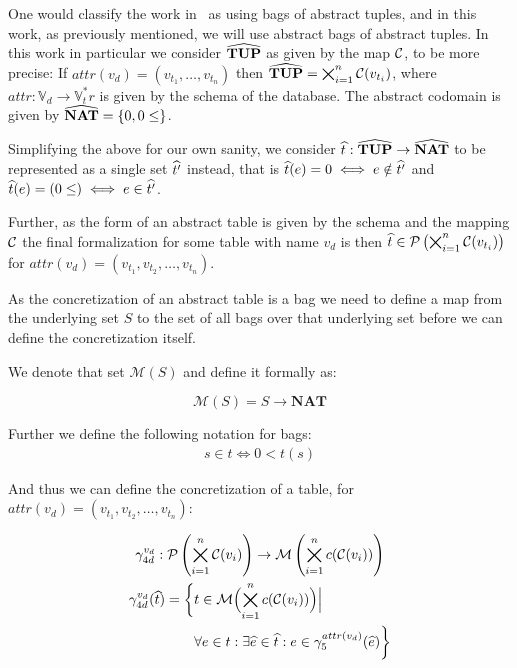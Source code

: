 One would classify the work in~\cite{halder_abstract_2012} as using bags of abstract tuples, and in this work, as previously mentioned, we will use abstract bags of abstract tuples.
In this work in particular we consider $\widehat{\mathbf{TUP}}$ as given by the map $\mathcal{C}$, to be more precise:
If $attr(v_d) = (v_{t_1}, \dots, v_{t_n})$ then $\widehat{\mathbf{TUP}} = \bigtimes_{i = 1}^n \mathcal{C}(v_{t_i})$, where $attr : \mathbb{V}_d \rightarrow \mathbb{V}_t^*r$ is given by the schema of the database.
The abstract codomain is given by $\widehat{\mathbf{NAT}} = \{0, 0 \leq\}$.

Simplifying the above for our own sanity, we consider $\widehat{t} : \widehat{\mathbf{TUP}} \rightarrow \widehat{\mathbf{NAT}}$ to be represented as a single set $\widehat{t'}$ instead, that is $\widehat{t}({e}) = 0 \iff e \notin \widehat{t'}$ and  $\widehat{t}({e}) = (0 \leq) \iff e \in \widehat{t'}$.

Further, as the form of an abstract table is given by the schema and the mapping $\mathcal{C}$ the final formalization for some table with name $v_d$ is then $\widehat{t} \in \mathcal{P}\left(\bigtimes_{i = 1}^{n}\mathcal{C}(v_{t_i})\right)$ for $attr(v_d) = (v_{t_1}, v_{t_2}, \dots, v_{t_n})$.

As the concretization of an abstract table is a bag we need to define a map from the underlying set $S$ to the set of all bags over that underlying set before we can define the concretization itself.

We denote that set $\mathcal{M}(S)$ and define it formally as:

\begin{equation}
    \mathcal{M}(S) = S \rightarrow \mathbf{NAT}\label{eq:equation-nums}
\end{equation}

Further we define the following notation for bags:
\begin{align}
    s \in t \iff 0 < t(s)
\end{align}

And thus we can define the concretization of a table, for $attr(v_d) = (v_{t_1}, v_{t_2}, \dots, v_{t_n})$:


\begin{gather}
    \gamma^{v_d}_{4d} : \mathcal{P}\left(\bigtimes_{i = 1}^{n}\mathcal{C}(v_i)\right) \rightarrow \mathcal{M}\left(\bigtimes_{i = 1}^n c(\mathcal{C}(v_i))\right)\\
    \begin{split}
        \gamma^{v_d}_{4d}(\widehat{t}) = \biggl\{ &t \in \mathcal{M}\Bigl(\bigtimes_{i = 1}^n c(\mathcal{C}(v_i))\Bigr) \Big|\\
        &\forall e \in t : \exists \widehat{e} \in \widehat{t} : e \in \gamma^{attr(v_d)}_5(\widehat{e}) \biggr\}
    \end{split}
\end{gather}

